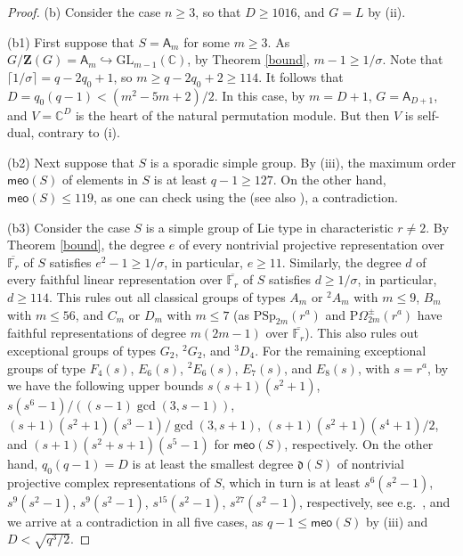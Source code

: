 \documentclass[11pt]{amsart}
\theoremstyle{plain}
\theoremstyle{definition}
\numberwithin{thm}{section}
\numberwithin{equation}{thm}
\newcommand{\inj}{\hookrightarrow}
\newcommand{\GL}{\mathrm{GL}}
\newcommand{\PSp}{\mathrm{PSp}}
\newcommand{\C}{{\mathbb C}}
\newcommand{\F}{{\mathbb F}}
\newcommand{\0}{\emptyset}
\newcommand{\ZB}{{\mathbf Z}}
\newcommand{\ABS}{\mathsf{A}}
\newcommand{\meo}{\mathsf{meo}}
\newcommand{\dl}{\mathfrak{d}}
\newcommand{\tw}[1]{{}^#1\!}
\begin{document}
\begin{proof}
\smallskip
(b) Consider the case $n \geq 3$, so that $D \geq 1016$, and $G=L$ by (ii). 

\smallskip
(b1) First suppose that $S = \ABS_m$ for some $m \geq 3$. As $G/\ZB(G) = \ABS_m \inj \GL_{m-1}(\C)$, by Theorem \ref{bound}, 
$m-1 \geq 1/\sigma$. Note that $\lceil 1/\sigma \rceil = q-2q_0+1$, so $m \geq q-2q_0+2 \geq 114$. It follows
that $D = q_0(q-1) < (m^2-5m+2)/2$.  In this case, by \cite[Lemma 6.1]{GT} 
$m=D+1$, $G=\ABS_{D+1}$, and $V=\C^D$ is
the heart of the natural permutation module. But then $V$ is self-dual, contrary to (i).

\smallskip
(b2) Next suppose that $S$ is a sporadic simple group. By (iii), the maximum order $\meo(S)$ of elements in $S$ is at least 
$q-1 \geq 127$. On the other hand, $\meo(S) \leq 119$, as one can check using 
the \cite{ATLAS} (see also 
\cite[Table 2]{KT5}), a contradiction.

\smallskip
(b3) Consider the case $S$ is a simple group of Lie type in characteristic $r \neq 2$. By Theorem \ref{bound}, the degree $e$ of every nontrivial projective representation over $\overline{\F_r}$ of $S$ satisfies $e^2-1 \geq 1/\sigma$, in particular, $e \geq 11$. Similarly, the degree $d$ of every faithful linear representation over $\overline{\F_r}$ of $S$ satisfies $d \geq 1/\sigma$, in particular, $d \geq 114$.
This rules out all classical groups of types $A_m$ or $\tw2 A_m$ with $m \leq 9$, $B_m$ with $m \leq 56$, and
$C_m$ or $D_m$ with $m \leq 7$ (as $\PSp_{2m}(r^a)$ and $\mathrm{P}\Omega^\pm_{2m}(r^a)$ have faithful representations of degree $m(2m-1)$ over $\overline{\F_r}$). This also rules out exceptional groups of types $G_2$, $\tw2 G_2$, and $\tw3 D_4$. For
the remaining exceptional groups of type $F_4(s)$, $E_6(s)$, $\tw2 E_6(s)$, $E_7(s)$, and $E_8(s)$, with $s=r^a$, by 
\cite[Table A7]{KS} we have the following upper bounds 
$s(s+1)(s^2+1)$, $s(s^6-1)/((s-1)\gcd(3,s-1))$, $(s+1)(s^2+1)(s^3-1)/\gcd(3,s+1)$, $(s+1)(s^2+1)(s^4+1)/2$, and 
$(s+1)(s^2+s+1)(s^5-1)$ for $\meo(S)$, respectively. On the other hand, $q_0(q-1) = D$ is at least the smallest 
degree $\dl(S)$ of nontrivial projective complex representations of $S$, which in turn is at least 
$s^6(s^2-1)$, $s^9(s^2-1)$, $s^9(s^2-1)$, $s^{15}(s^2-1)$, $s^{27}(s^2-1)$, respectively, see e.g.\ \cite[Table I]{TZ}, and 
we arrive at a contradiction in all five cases, as $q-1 \leq \meo(S)$ by (iii) and $D < \sqrt{q^3/2}$.


\end{proof}
\end{document}
